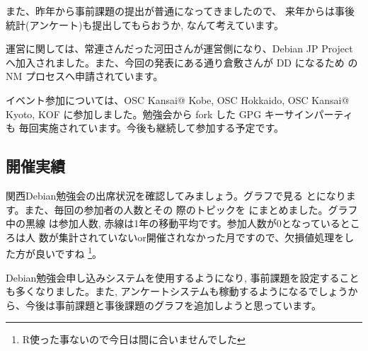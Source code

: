 \documentclass[mingoth,a4paper]{jsarticle}
\begin{document}
また、昨年から事前課題の提出が普通になってきましたので、
来年からは事後統計(アンケート)も提出してもらおうか, なんて考えています。

運営に関しては、常連さんだった河田さんが運営側になり、Debian JP Project
へ加入されました。また、今回の発表にある通り倉敷さんが DD になるため
の NM プロセスへ申請されています。

イベント参加については、OSC Kansai@ Kobe, OSC Hokkaido, OSC Kansai@
Kyoto, KOF に参加しました。勉強会から fork した GPG キーサインパーティも
毎回実施されています。今後も継続して参加する予定です。

\subsection{開催実績}

関西Debian勉強会の出席状況を確認してみましょう。グラフで見る
とになります。また、毎回の参加者の人数とその
際のトピックを  にまとめました。グラフ中の黒線
は参加人数, 赤線は1年の移動平均です。参加人数が$0$となっているところは人
数が集計されていないor開催されなかった月ですので、欠損値処理をした方が良いですね%
\footnote{R使った事ないので今日は間に合いませんでした}。

Debian勉強会申し込みシステムを使用するようになり, 事前課題を設定すること
も多くなりました。また, アンケートシステムも稼動するようになるでしょうか
ら、今後は事前課題と事後課題のグラフを追加しようと思っています。
\end{document}
